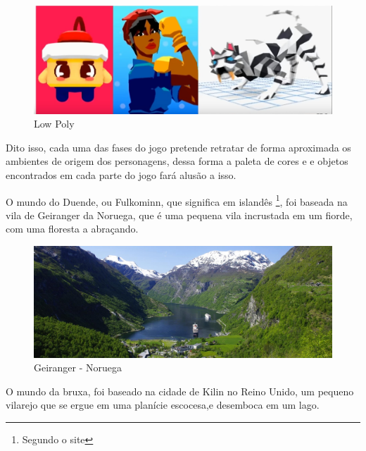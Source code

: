 \begin{figure}[htb]
    \caption{\label{fig_lowpoly}Low Poly}
    \begin{center}
        \includegraphics[width=\textwidth]{imagens/lowPoly.jpg}
    \end{center}
\end{figure}

Dito isso, cada uma das fases do jogo pretende retratar de forma aproximada os ambientes de origem dos personagens, dessa forma a paleta de cores e e objetos encontrados em cada parte do jogo fará alusão a isso.

O mundo do Duende, ou Fulkominn, que significa em islandês \footnote{Segundo o site }, foi baseada na vila de Geiranger da Noruega, que é uma pequena vila incrustada em um fiorde, com uma floresta a abraçando.

\clearpage

\begin{figure}[htb]
    \caption{\label{fig_mundoDuende}Geiranger - Noruega}
    \begin{center}
        \includegraphics[width=\textwidth]{imagens/geiranger.jpeg}
    \end{center}
\end{figure}



O mundo da bruxa, foi baseado na cidade de Kilin no Reino Unido, um pequeno vilarejo que se ergue em uma planície escocesa,e desemboca em um lago.

